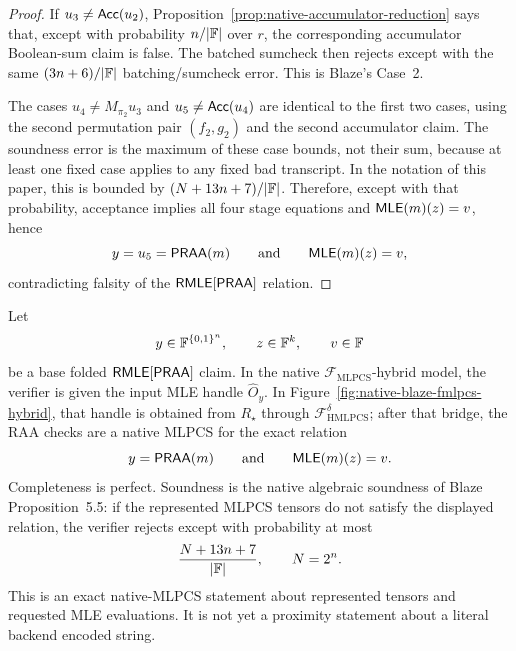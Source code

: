 \begin{proof}
If \(u_3\ne\mathsf{Acc}(u_2)\), Proposition~\ref{prop:native-accumulator-reduction}
says that, except with probability \(n/|\mathbb{F}|\) over \(r\), the corresponding
accumulator Boolean-sum claim is false.  The batched sumcheck then rejects
except with the same \((3n+6)/|\mathbb{F}|\) batching/sumcheck error.  This is Blaze's
Case~2.

The cases \(u_4\ne M_{\pi_2}u_3\) and \(u_5\ne\mathsf{Acc}(u_4)\) are identical to the
first two cases, using the second permutation pair \((f_2,g_2)\) and the
second accumulator claim.  The soundness error is the maximum of these case
bounds, not their sum, because at least one fixed case applies to any fixed bad
transcript.  In the notation of this paper, this is bounded by
\((N+13n+7)/|\mathbb{F}|\).  Therefore, except with that probability, acceptance
implies all four stage equations and \(\mathsf{MLE}(m)(z)=v\), hence
\[
  y=u_5=\mathsf{PRAA}(m)
  \qquad\text{and}\qquad
  \mathsf{MLE}(m)(z)=v,
\]
contradicting falsity of the \(\mathsf{RMLE}[\mathsf{PRAA}]\) relation.
\end{proof}

\begin{lemma}
\label{lem:native-praa-mlpcs}
Let
\[
  y\in\mathbb{F}^{\{0,1\}^n},\qquad z\in\mathbb{F}^k,\qquad v\in\mathbb{F}
\]
be a base folded \(\mathsf{RMLE}[\mathsf{PRAA}]\) claim.  In the native
\(\mathcal F_{\mathrm{MLPCS}}\)-hybrid model, the verifier is given the input
MLE handle \(\widehat O_y\).  In Figure~\ref{fig:native-blaze-fmlpcs-hybrid},
that handle is obtained from \(R_\star\) through
\(\mathcal F_{\mathrm{HMLPCS}}^\delta\); after that bridge, the RAA checks are
a native MLPCS for the exact relation
\[
  y=\mathsf{PRAA}(m)
  \qquad\text{and}\qquad
  \mathsf{MLE}(m)(z)=v.
\]
Completeness is perfect.  Soundness is the native algebraic soundness of Blaze
Proposition~5.5: if the represented MLPCS tensors do not satisfy the displayed
relation, the verifier rejects except with probability at most
\[
  \frac{N+13n+7}{|\mathbb{F}|},
  \qquad N=2^n.
\]
This is an exact native-MLPCS statement about represented tensors and requested
MLE evaluations.  It is not yet a proximity statement about a literal backend
encoded string.
\end{lemma}


